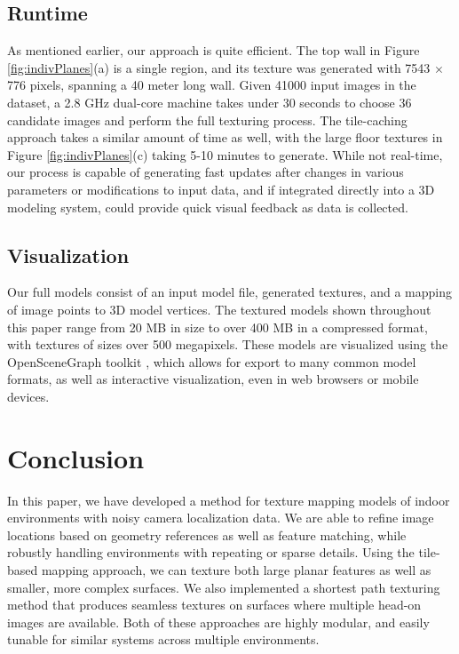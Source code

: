 \documentclass[]{spie}  %
\begin{document}
\subsection{Runtime}
As mentioned earlier, our approach is quite efficient. The top wall in
Figure \ref{fig:indivPlanes}(a) is a single region, and its texture
was generated with 7543 $\times$ 776 pixels, spanning a 40 meter long
wall. Given 41000 input images in the dataset, a 2.8 GHz dual-core
machine takes under 30 seconds to choose 36 candidate images and
perform the full texturing process. The tile-caching approach takes a
similar amount of time as well, with the large floor textures in
Figure \ref{fig:indivPlanes}(c) taking 5-10 minutes to generate.
While not real-time, our process is capable of generating fast updates
after changes in various parameters or modifications to input data,
and if integrated directly into a 3D modeling system, could provide
quick visual feedback as data is collected.


\subsection{Visualization}
Our full models consist of an input model file, generated textures,
and a mapping of image points to 3D model vertices. The textured
models shown throughout this paper range from 20 MB in size to over
400 MB in a compressed format, with textures of sizes over 500
megapixels. These models are visualized using the OpenSceneGraph
toolkit \cite{openscenegraph}, which allows for export to many common
model formats, as well as interactive visualization, even in web
browsers or mobile devices.

\section{Conclusion}
\label{sec:conclusion}

In this paper, we have developed a method for texture mapping models
of indoor environments with noisy camera localization data. We are
able to refine image locations based on geometry references as well as
feature matching, while robustly handling environments with repeating
or sparse details. Using the tile-based mapping approach, we can
texture both large planar features as well as smaller, more complex
surfaces. We also implemented a shortest path texturing method that
produces seamless textures on surfaces where multiple head-on images are
available. Both of these approaches are highly modular, and easily
tunable for similar systems across multiple environments.
\end{document}

